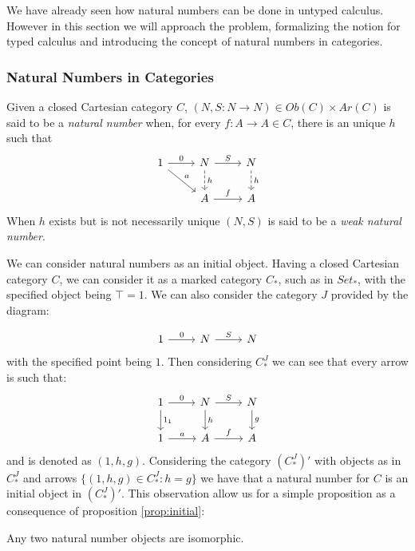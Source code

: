 We have already seen how natural numbers can be done in untyped calculus. However in this section we will approach the problem, formalizing the notion for typed calculus and introducing the concept of natural numbers in categories.

\subsubsection{Natural Numbers in Categories}


\begin{definition}
  Given a closed Cartesian category $C$,  $(N,S:N\to N)\in Ob(C)\times Ar(C)$ is said to be a \emph{natural number} when, for every $f:A\to A\in C$, there is an unique $h$ such that
  \[
    \begin{tikzcd}
      1\arrow{dr}{a}\arrow{r}{0} & N\arrow{r}{S}\arrow[dashed]{d}{h} & N\arrow[dashed]{d}{h}\\
      & A\arrow{r}{f} & A
    \end{tikzcd}
  \]
  When $h$ exists but is not necessarily unique $(N,S)$ is said to be a \emph{weak natural number}.
\end{definition}

We can consider natural numbers as an initial object. Having a closed Cartesian category $C$, we can consider it as a marked category $C_*$, such as in $Set_*$, with the specified object being $\top =1$. We can also consider the category $J$ provided by the diagram:

\[
  \begin{tikzcd}
    1\arrow{r}{0} & N\arrow{r}{S} & N
  \end{tikzcd}
\]
with the specified point being $1$. Then considering $C_*^J$ we can see that every arrow is such that: 
\[
  \begin{tikzcd}
    1\arrow{r}{0}\arrow{d}{1_1} & N\arrow{r}{S}\arrow{d}{h} & N\arrow{d}{g}\\
    1\arrow{r}{a} & A\arrow{r}{f} & A
  \end{tikzcd}
\]
and is denoted as $(1,h,g)$. Considering the category $(C_*^J)'$ with objects as in $C_*^J$ and arrows  $\{(1,h,g)\in C_*^J: h=g\}$ we have that a natural number for $C$ is an initial object in $(C_*^J)'$. This observation allow us for a simple proposition as a consequence of proposition \ref{prop:initial}:

\begin{proposition}
  Any two natural number objects are isomorphic.
\end{proposition}

